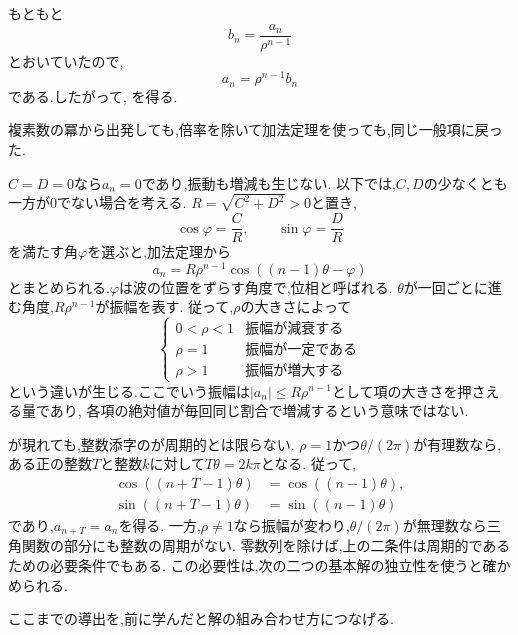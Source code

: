   もともと
  \[
    b_n=\frac{a_n}{\rho^{n-1}}
  \]
  とおいていたので,
  \[
    a_n=\rho^{n-1} b_n
  \]
  である.したがって,
  \BookMathLayout{\[
    a_n=\rho^{n-1}\{C\cos((n-1)\theta)+D\sin((n-1)\theta)\}
  \]}{\[
    \begin{aligned}
      a_n=\rho^{n-1}\{&C\cos((n-1)\theta)\\
                     &+D\sin((n-1)\theta)\}
    \end{aligned}
  \]}
  を得る.

  複素数の冪から出発しても,倍率を除いて加法定理を使っても,同じ一般項に戻った.

  $C=D=0$なら$a_n=0$であり,振動も増減も生じない.
  以下では,$C,D$の少なくとも一方が$0$でない場合を考える.
  $R=\sqrt{C^2+D^2}>0$と置き,
  \[
    \cos\varphi=\frac{C}{R},\qquad
    \sin\varphi=\frac{D}{R}
  \]
  を満たす角$\varphi$を選ぶと,加法定理から
  \[
    a_n=R\rho^{n-1}\cos((n-1)\theta-\varphi)
  \]
  とまとめられる.$\varphi$は波の位置をずらす角度で,位相と呼ばれる.
  $\theta$が一回ごとに進む角度,$R\rho^{n-1}$が振幅を表す.
  従って,$\rho$の大きさによって
  \[
    \begin{cases}
      0<\rho<1 & \text{振幅が減衰する}\\
      \rho=1 & \text{振幅が一定である}\\
      \rho>1 & \text{振幅が増大する}
    \end{cases}
  \]
  という違いが生じる.ここでいう振幅は$|a_n|\le R\rho^{n-1}$として項の大きさを押さえる量であり,
  各項の絶対値が毎回同じ割合で増減するという意味ではない.

  が現れても,整数添字のが周期的とは限らない.
  $\rho=1$かつ$\theta/(2\pi)$が有理数なら,
  ある正の整数$T$と整数$k$に対して$T\theta=2k\pi$となる.
  従って,
  \[
    \begin{aligned}
      \cos((n+T-1)\theta)&=\cos((n-1)\theta),\\
      \sin((n+T-1)\theta)&=\sin((n-1)\theta)
    \end{aligned}
  \]
  であり,$a_{n+T}=a_n$を得る.
  一方,$\rho\ne1$なら振幅が変わり,$\theta/(2\pi)$が無理数なら三角関数の部分にも整数の周期がない.
  零数列を除けば,上の二条件は周期的であるための必要条件でもある.
  この必要性は,次の二つの基本解の独立性を使うと確かめられる.

  \label{解釈：虚数解と基本解}
  ここまでの導出を,前に学んだと解の組み合わせ方につなげる.

